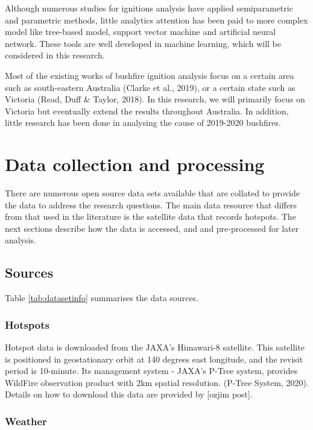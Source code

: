 \documentclass{monashthesis}
\begin{document}
Although numerous studies for ignitions analysis have applied
semiparametric and parametric methods, little analytics attention has
been paid to more complex model like tree-based model, support vector
machine and artificial neural network. These tools are well developed in
machine learning, which will be considered in this research.

Most of the existing works of bushfire ignition analysis focus on a
certain area such as south-eastern Australia (Clarke et al., 2019), or a
certain state such as Victoria (Read, Duff \& Taylor, 2018). In this
research, we will primarily focus on Victoria but eventually extend the
results throughout Australia. In addition, little research has been done
in analysing the cause of 2019-2020 bushfires.

\chapter{Data collection and
processing}\label{data-collection-and-processing}

There are numerous open source data sets available that are collated to
provide the data to address the research questions. The main data
resource that differs from that used in the literature is the satellite
data that records hotspots. The next sections describe how the data is
accessed, and and pre-processed for later analysis.

\section{Sources}\label{sources}

Table \ref{tab:datasetinfo} summarises the data sources.

\subsection{Hotspots}\label{hotspots}

Hotspot data is downloaded from the JAXA's Himawari-8 satellite. This
satellite is positioned in geostationary orbit at 140 degrees east
longitude, and the revisit period is 10-minute. Its management system -
JAXA's P-Tree system, provides WildFire observation product with 2km
spatial resolution. (P-Tree System, 2020). Details on how to download
this data are provided by {[}ozjim post{]}.

\subsection{Weather}\label{weather}
\end{document}
